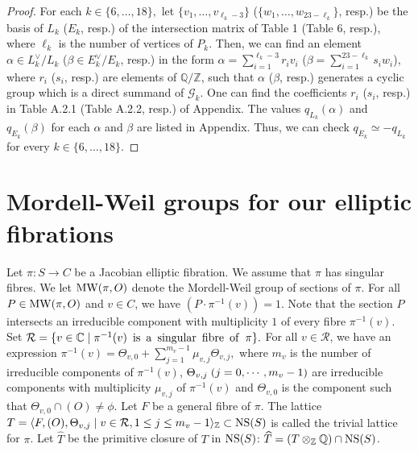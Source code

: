 \documentclass[10pt]{article}
\begin{document}
\begin{proof}
For each $k\in\{6,\ldots, 18\},$
let $\{v_1,\ldots,v_{\ell_k-3}\}$ ($\{w_1,\ldots,w_{23-\ell_k}\}$,  resp.)  be the basis of $L_k$  ($E_k$, resp.)
of the intersection matrix of Table 1 
(Table 6, resp.),
where $\ell_k$ is the number of vertices of $P_k$.
Then, we can find an element 
$\alpha \in L_k^\vee / L_k$ 
($\beta\in E_k^\vee/E_k$, resp.) 
in the form
$\alpha = \sum_{i=1}^{\ell_k-3} r_i v_i $
($\beta = \sum_{i=1}^{23-\ell_k} s_i w_i $),
where $r_i$ ($s_i$, resp.) are elements of $\mathbb{Q}/\mathbb{Z}$,
such that $\alpha $ ($\beta$, resp.) generates a cyclic group which is a direct summand of $\mathcal{G}_k$.
One can find the coefficients $r_i$ ($s_i$, resp.) in Table A.2.1 (Table A.2.2, resp.) of Appendix.
The values $q_{L_k}(\alpha)$ and $q_{E_k}(\beta)$ for each $\alpha$ and $\beta$ are listed in Appendix.
Thus, we can check $q_{E_k} \simeq - q_{L_k}$ for every $k\in \{6,\ldots, 18\}$.
\end{proof}


 
 
\section{Mordell-Weil groups for our elliptic fibrations}

 Let  $\pi : S \rightarrow C$ be a Jacobian elliptic fibration.
We assume that  $\pi$ has singular fibres.
We let ${\rm MW}(\pi,O)$ denote the Mordell-Weil group of sections of $\pi$.
For all $P\in {\rm MW}(\pi,O)$ and $v\in C$, 
we have $(P\cdot \pi^{-1}(v))=1$.
Note that the section $P$ intersects  an irreducible component with multiplicity $1$ of every fibre $\pi^{-1}(v)$.
Set 
$
\mathcal{R} = \{ v\in \mathbb{C} \mid  \pi^{-1}(v) {\rm \enspace is \enspace a \enspace singular \enspace fibre \enspace of \enspace} \pi \}.
$
For all $v\in \mathcal{R}$, we have an expression
$
\pi^{-1}(v)=\Theta_{v,0}+ \sum_{j=1}^{m_v-1} \mu _{v,j} \Theta_{v,j},
$
where $m_v$ is the number of irreducible components of $\pi^{-1}(v)$, $\Theta_{v,j} \hspace{1mm} (j=0,\cdots,m_v -1)$ are irreducible components with multiplicity $\mu_{v,j}$ of $\pi^{-1}(v)$
and $\Theta_{v,0}$ is the component such that $\Theta_{v,0} \cap (O) \not= \phi$.
Let $F$ be a general fibre of $\pi$.
The lattice
$
T=\langle F, (O), \Theta_{v,j} \mid v\in \mathcal{R}, 1\leq j \leq m_v-1   \rangle_{\mathbb{Z}} \subset {\rm NS}(S)
$
is called  the trivial lattice for $\pi$.
Let $\widehat{T}$ be the primitive closure of $T$ in ${\rm NS}(S)$: $\widehat{T}=(T \otimes _{\mathbb{Z}}  \mathbb{Q}) \cap {\rm NS}(S)$.
\end{document}
